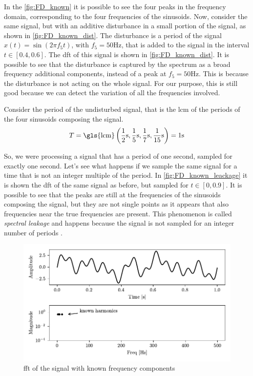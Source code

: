 In the \autoref{fig:FD_known} it is possible to see the four peaks in the frequency domain, corresponding to the four frequencies of the sinusoids. Now, consider the same signal, but with an additive disturbance in a small portion of the signal, as shown in \autoref{fig:FD_known_dist}. The disturbance is a period of the signal $x(t) = \sin(2\pi f_5 t)$, with $f_5=50\si{\Hz}$, that is added to the signal in the interval $t \in [0.4, 0.6]$. The \gls{dft} of this signal is shown in \autoref{fig:FD_known_dist}. It is possible to see that the disturbance is captured by the spectrum as a broad frequency additional components, instead of a peak at $f_5=50\si{\Hz}$. This is because the disturbance is not acting on the whole signal. For our purpose, this is still good because we can detect the variation of all the frequencies involved.

Consider the period of the undisturbed signal, that is the \gls{lcm} of the periods of the four sinusoids composing the signal.
\[ 
    T = \text{\gls{lcm}} \left( \frac{1}{2} \si{\s},\frac{1}{5}\si{\s},\frac{1}{7}\si{\s},\frac{1}{15}\si{\s} \right) = 1 \si{\s}
\]

So, we were processing a signal that has a period of one second, sampled for exactly one second. Let's see what happens if we sample the same signal for a time that is not an integer multiple of the period. In \autoref{fig:FD_known_leackage} it is shown the \gls{dft} of the same signal as before, but sampled for $t \in [0, 0.9]$. It is possible to see that the peaks are still at the frequencies of the sinusoids composing the signal, but they are not single points as it appears that also frequencies near the true frequencies are present. This phenomenon is called \emph{spectral leakage} and happens because the signal is not sampled for an integer number of periods \cite{SpectralLeakage}. 


\begin{figure}
    \centering
    \includegraphics[width=\textwidth]{images/FeatureExtraction/FD_known.pdf}
    \caption{\gls{fft} of the signal with known frequency components}
    \label{fig:FD_known}
\end{figure}

